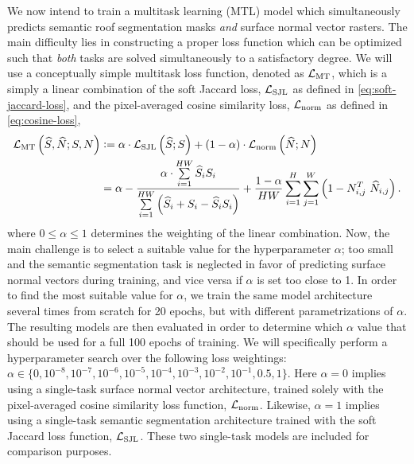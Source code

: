We now intend to train a multitask learning (MTL) model which simultaneously predicts semantic roof segmentation masks \emph{and} surface normal vector rasters.
The main difficulty lies in constructing a proper loss function which can be optimized such that \emph{both} tasks are solved simultaneously to a satisfactory degree.
We will use a conceptually simple multitask loss function, denoted as $\mathcal{L}_{\mathrm{MT}}$, which is a simply a linear combination of the soft Jaccard loss, $\mathcal{L}_{\mathrm{SJL}}$ as defined in \cref{eq:soft-jaccard-loss}, and the pixel-averaged cosine similarity loss, $\mathcal{L}_{\mathrm{norm}}$ as defined in \cref{eq:cosine-loss},
\begin{align*}
  \mtlossf
  &\defeq
  \alpha \cdot \seglossf
  +
  (1 - \alpha) \cdot \normlossf
  \\
  &=
  \alpha - \frac{%
    \alpha \cdot \sum\limits_{i = 1}^{HW}
    \predsegraster_i \segraster_i
  }{%
    \sum\limits_{i = 1}^{HW} \left(
      \predsegraster_i
      +
      \segraster_i
      -
      \predsegraster_i \segraster_i
    \right)
  }
  +
  \frac{1 - \alpha}{HW}
  \sum_{i = 1}^{H} \sum_{j = 1}^{W} \left(
    1 - \normraster_{i,j}^T~\prednormraster_{i,j}
  \right).
\end{align*}
%
where $0 \leq \alpha \leq 1$ determines the weighting of the linear combination.
Now, the main challenge is to select a suitable value for the hyperparameter $\alpha$; too small and the semantic segmentation task is neglected in favor of predicting surface normal vectors during training, and vice versa if $\alpha$ is set too close to 1.
In order to find the most suitable value for $\alpha$, we train the same model architecture several times from scratch for 20 epochs, but with different parametrizations of $\alpha$.
The resulting models are then evaluated in order to determine which $\alpha$ value that should be used for a full 100 epochs of training.
We will specifically perform a hyperparameter search over the following loss weightings: $\alpha \in \{0,\allowbreak 10^{-8},\allowbreak 10^{-7},\allowbreak 10^{-6},\allowbreak 10^{-5},\allowbreak 10^{-4},\allowbreak 10^{-3},\allowbreak 10^{-2},\allowbreak 10^{-1},\allowbreak 0.5,\allowbreak 1\}$.
Here $\alpha = 0$ implies using a single-task surface normal vector architecture, trained solely with the pixel-averaged cosine similarity loss function, $\mathcal{L}_{\mathrm{norm}}$.
Likewise, $\alpha = 1$ implies using a single-task semantic segmentation architecture trained with the soft Jaccard loss function, $\mathcal{L}_{\mathrm{SJL}}$.
These two single-task models are included for comparison purposes.


